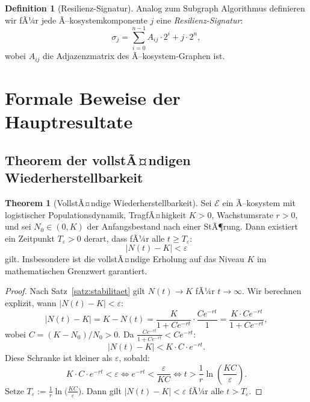 ﻿\documentclass[a4paper,12pt]{article}
\theoremstyle{definition}
\newtheorem{definition}{Definition}
\newtheorem{theorem}{Theorem}
\begin{document}
\begin{definition}[Resilienz-Signatur]
	Analog zum Subgraph Algorithmus \cite{epp2026subgraph} definieren wir fÃ¼r jede Ã–kosystemkomponente $j$ eine \emph{Resilienz-Signatur}:
	\[
	\sigma_j = \sum_{i=0}^{n-1} A_{ij} \cdot 2^i + j \cdot 2^n,
	\]
	wobei $A_{ij}$ die Adjazenzmatrix des Ã–kosystem-Graphen ist.
\end{definition}

\section{Formale Beweise der Hauptresultate}
\label{sec:beweise}

\subsection{Theorem der vollstÃ¤ndigen Wiederherstellbarkeit}

\begin{theorem}[VollstÃ¤ndige Wiederherstellbarkeit]
	\label{thm:wiederherstellung}
	Sei $\mathcal{E}$ ein Ã–kosystem mit logistischer Populationsdynamik, TragfÃ¤higkeit $K > 0$, Wachstumsrate $r > 0$, und sei $N_0 \in (0, K)$ der Anfangsbestand nach einer StÃ¶rung. Dann existiert ein Zeitpunkt $T_\varepsilon > 0$ derart, dass fÃ¼r alle $t \geq T_\varepsilon$:
	\[
	|N(t) - K| < \varepsilon
	\]
	gilt. Insbesondere ist die vollstÃ¤ndige Erholung auf das Niveau $K$ im mathematischen Grenzwert garantiert.
\end{theorem}

\begin{proof}
	Nach Satz~\ref{satz:stabilitaet} gilt $N(t) \to K$ fÃ¼r $t \to \infty$. Wir berechnen explizit, wann $|N(t) - K| < \varepsilon$:
	\[
	|N(t) - K| = K - N(t) = \frac{K}{1 + Ce^{-rt}} \cdot \frac{Ce^{-rt}}{1} = \frac{K \cdot C e^{-rt}}{1 + C e^{-rt}},
	\]
	wobei $C = (K - N_0)/N_0 > 0$. Da $\frac{C e^{-rt}}{1 + C e^{-rt}} < C e^{-rt}$:
	\[
	|N(t) - K| < K \cdot C \cdot e^{-rt}.
	\]
	Diese Schranke ist kleiner als $\varepsilon$, sobald:
	\[
	K \cdot C \cdot e^{-rt} < \varepsilon \iff e^{-rt} < \frac{\varepsilon}{KC} \iff t > \frac{1}{r} \ln\!\left(\frac{KC}{\varepsilon}\right).
	\]
	Setze $T_\varepsilon := \frac{1}{r} \ln\!\bigl(\frac{KC}{\varepsilon}\bigr)$. Dann gilt $|N(t) - K| < \varepsilon$ fÃ¼r alle $t > T_\varepsilon$. \qedhere
\end{proof}
\end{document}
